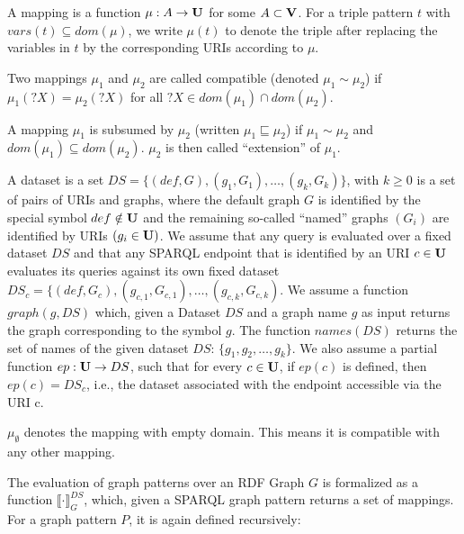 \begin{definition}
	A mapping is a function $\mu: A \rightarrow  \mathbf{U}$ for some $A \subset \mathbf{V}$. 
	For a triple pattern $t$ with $vars(t) \subseteq dom(\mu)$, we write $\mu(t)$ to 
	denote the triple after replacing the variables in $t$ by the corresponding 
	URIs according to $\mu$. 

	\noindent Two mappings $\mu_1$ and $\mu_2$ are called compatible (denoted $\mu_1 \sim \mu_2$) 
	if $\mu_1(?X) = \mu_2(?X)$ for all $?X \in dom(\mu_1) \cap dom(\mu_2)$.

	\noindent A mapping $\mu_1$ is subsumed by $\mu_2$ (written $\mu_1 \sqsubseteq \mu_2$) 
	if $\mu_1 \sim \mu_2$ and $dom(\mu_1) \subseteq dom(\mu_2)$. $\mu_2$ is then called ``extension'' of $\mu_1$.

	A dataset is a set $DS = \{(def, G), (g_1,G_1), \dots, (g_k, G_k) \}$, with
	$k\geq 0$ is a set of pairs of URIs and graphs,
	where the default graph $G$ is identified by the special symbol $def \notin \mathbf{U}$
	and the remaining so-called ``named'' graphs $(G_i)$ are identified by URIs
	$(g_i \in \mathbf{U})$. We assume that any query is evaluated over a fixed dataset $DS$
	and that any SPARQL endpoint that is identified by an URI $c \in \mathbf{U}$ evaluates
	its queries against its own fixed dataset $DS_c = \{ (def, G_c),
		(g_{c,1},G_{c,1}), \dots, (g_{c,k},G_{c,k})$.
		We assume a function $graph(g,DS)$ which, given a Dataset $DS$ and a graph name $g$ as
		input returns the graph corresponding to the symbol $g$. The function
		$names(DS)$ returns the set of names of the given dataset $DS$:
		$\{g_1,g_2,\dots,g_k\}$.
		We also assume a partial function $ep: \mathbf{U} \rightarrow DS$, such that for every $c \in
		\mathbf{U}$, if $ep(c)$ is defined, then $ep(c) = DS_c$, i.e., the dataset associated with
		the endpoint accessible via the URI c.

		$\mu_\emptyset$ denotes the mapping with empty domain. This means it is
		compatible with any other mapping.


		The evaluation of graph patterns over an RDF Graph $G$ is formalized as a
		function  $\llbracket \cdot \rrbracket_G^{DS}$, which, given a SPARQL graph pattern
		returns a set of mappings.
		For a graph pattern $P$, it is again defined recursively:


\end{definition}
